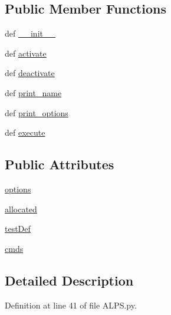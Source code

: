 \subsection*{Public Member Functions}
\begin{DoxyCompactItemize}
\item 
def \hyperlink{class_a_l_p_s_1_1_a_l_p_s_a45417f6290435c66b3f3b7c4586915d9}{\-\_\-\-\_\-init\-\_\-\-\_\-}
\item 
def \hyperlink{class_a_l_p_s_1_1_a_l_p_s_a3d507bd3feb505c8ed1b4e8f3729d636}{activate}
\item 
def \hyperlink{class_a_l_p_s_1_1_a_l_p_s_aa1d63291a23bcca8ccbd44dc4d0fa6bf}{deactivate}
\item 
def \hyperlink{class_a_l_p_s_1_1_a_l_p_s_a97e56ee7f5faaea26121d6ee0deeddab}{print\-\_\-name}
\item 
def \hyperlink{class_a_l_p_s_1_1_a_l_p_s_a68c17d876ad850e44d40aa082b674f4e}{print\-\_\-options}
\item 
def \hyperlink{class_a_l_p_s_1_1_a_l_p_s_af4b8efc64ea3abc5fb21fb93bfe052ff}{execute}
\end{DoxyCompactItemize}
\subsection*{Public Attributes}
\begin{DoxyCompactItemize}
\item 
\hyperlink{class_a_l_p_s_1_1_a_l_p_s_a24dfa9b508f507c4cb6148f10a081555}{options}
\item 
\hyperlink{class_a_l_p_s_1_1_a_l_p_s_ac371dce53e8c120f7031259025562bdb}{allocated}
\item 
\hyperlink{class_a_l_p_s_1_1_a_l_p_s_a839c4f84a46683221d51004c08345ff2}{test\-Def}
\item 
\hyperlink{class_a_l_p_s_1_1_a_l_p_s_a64bae95ba692ef4df06f716692b50ee9}{cmds}
\end{DoxyCompactItemize}


\subsection{Detailed Description}


Definition at line 41 of file A\-L\-P\-S.\-py.



